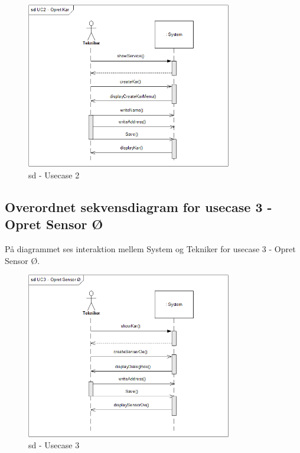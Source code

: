 \begin{figure}[H]
    \centering
    \includegraphics[width=0.8\textwidth]{Systemarkitektur/OverordnedeSekvensdiagrammer/sd_UC2.png}
    \caption{sd - Usecase 2}
    \label{fig:sd_UC2}
\end{figure}


\subsection*{Overordnet sekvensdiagram for usecase 3 - Opret Sensor Ø}
På diagrammet ses interaktion mellem System og Tekniker for usecase 3 - Opret Sensor Ø.

\begin{figure}[H]
    \centering
    \includegraphics[width=0.8\textwidth]{Systemarkitektur/OverordnedeSekvensdiagrammer/sd_UC3.png}
    \caption{sd - Usecase 3}
    \label{fig:sd_UC3}
\end{figure}

